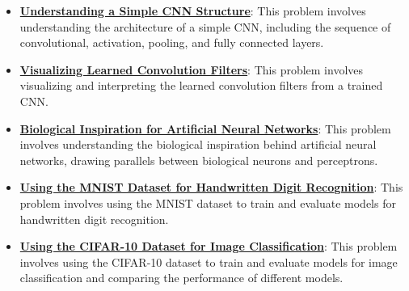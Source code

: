 \documentclass{article}%
\begin{document}
\begin{itemize}[leftmargin=*]
\item \href{https://purdue.brightspace.com/d2l/common/assets/pdfjs-d2l-dist/1.0.14-legacy/web/viewer.html?file=%2Fcontent%2Fenforced%2F1095467-wl.202510.CS.24300.001%2F09L1-cnn.pdf%3Fou%3D1095467&lang=en-us&container=d2l-fileviewer-rendered-pdf&fullscreen=d2l-fileviewer-rendered-pdf-dialog&height=667#page=17}{\textbf{Understanding a Simple CNN Structure}}: This problem involves understanding the architecture of a simple CNN, including the sequence of convolutional, activation, pooling, and fully connected layers.%
\item \href{https://purdue.brightspace.com/d2l/common/assets/pdfjs-d2l-dist/1.0.14-legacy/web/viewer.html?file=%2Fcontent%2Fenforced%2F1095467-wl.202510.CS.24300.001%2F09L1-cnn.pdf%3Fou%3D1095467&lang=en-us&container=d2l-fileviewer-rendered-pdf&fullscreen=d2l-fileviewer-rendered-pdf-dialog&height=667#page=18}{\textbf{Visualizing Learned Convolution Filters}}: This problem involves visualizing and interpreting the learned convolution filters from a trained CNN.%
\item \href{https://purdue.brightspace.com/d2l/common/assets/pdfjs-d2l-dist/1.0.14-legacy/web/viewer.html?file=%2Fcontent%2Fenforced%2F1095467-wl.202510.CS.24300.001%2F09L1-cnn.pdf%3Fou%3D1095467&lang=en-us&container=d2l-fileviewer-rendered-pdf&fullscreen=d2l-fileviewer-rendered-pdf-dialog&height=667#page=20}{\textbf{Biological Inspiration for Artificial Neural Networks}}: This problem involves understanding the biological inspiration behind artificial neural networks, drawing parallels between biological neurons and perceptrons.%
\item \href{https://purdue.brightspace.com/d2l/common/assets/pdfjs-d2l-dist/1.0.14-legacy/web/viewer.html?file=%2Fcontent%2Fenforced%2F1095467-wl.202510.CS.24300.001%2F09L1-cnn.pdf%3Fou%3D1095467&lang=en-us&container=d2l-fileviewer-rendered-pdf&fullscreen=d2l-fileviewer-rendered-pdf-dialog&height=667#page=21}{\textbf{Using the MNIST Dataset for Handwritten Digit Recognition}}: This problem involves using the MNIST dataset to train and evaluate models for handwritten digit recognition.%
\item \href{https://purdue.brightspace.com/d2l/common/assets/pdfjs-d2l-dist/1.0.14-legacy/web/viewer.html?file=%2Fcontent%2Fenforced%2F1095467-wl.202510.CS.24300.001%2F09L1-cnn.pdf%3Fou%3D1095467&lang=en-us&container=d2l-fileviewer-rendered-pdf&fullscreen=d2l-fileviewer-rendered-pdf-dialog&height=667#page=23}{\textbf{Using the CIFAR-10 Dataset for Image Classification}}: This problem involves using the CIFAR-10 dataset to train and evaluate models for image classification and comparing the performance of different models.%
\end{itemize}
\end{document}
